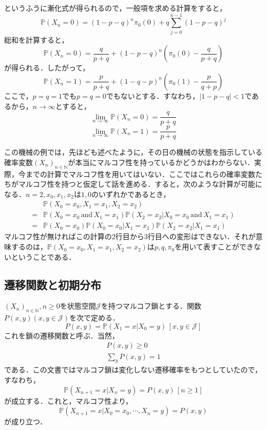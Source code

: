 \documentclass[12pt, a4paper]{jsarticle}
\theoremstyle{definition}
\newcommand{\NN}{{\mathbb{N}}} %
\begin{document}
というふうに漸化式が得られるので，一般項を求める計算をすると，
\begin{equation}
\mathbb{P}(X_n = 0) = (1-p-q)^n\pi_0(0) + q \sum_{j=0}^{n-1}(1-p-q)^j
\end{equation}
総和を計算すると，
\begin{equation}
	\mathbb{P}(X_n = 0) = \frac{q}{p+q} + (1- p- q)^{n} \left( \pi_0(0) - \frac{q}{p+ q} \right)
\end{equation}
が得られる．したがって，
\begin{equation}
	\mathbb{P}(X_n = 1) = \frac{p}{p+q} + (1- q- p)^{n} \left( \pi_0(1) - \frac{p}{q+ p} \right)
\end{equation}
ここで，$p=q=1$でも$p=q=0$でもないとする．すなわち，$|1-p-q| < 1$であるから，$n \to \infty$とすると，
\[\lim_{n \to \infty} \mathbb{P}(X_n = 0) = \frac{q}{p+q}\]
\[\lim_{n \to \infty} \mathbb{P}(X_n = 1) = \frac{p}{p+q}\]

この機械の例では，先ほども述べたように，その日の機械の状態を指示している確率変数$(X_n)_{n \in \NN}$が本当にマルコフ性を持っているかどうかはわからない．実際，今までの計算でマルコフ性を用いてはいない．ここではこれらの確率変数たちがマルコフ性を持つと仮定して話を進める．すると，次のような計算が可能になる．$n = 2,x_0,x_1,x_2$は$1,0$のいずれかであるとき，
\begin{align*}
	& \mathbb{P}(X_0 = x_0 , X_1 = x_1, X_2 = x_2) \\
	= &\mathbb{P}(X_0 = x_0\, \text{and}\, X_1 = x_1)\mathbb{P}(X_2 = x_2 | X_0 = x_0\, \text{and}\, X_1 = x_1 ) \\
	=&\mathbb{P}(X_0 = x_0)\mathbb{P}(X_0 = x_0| X_1 = x_1)\mathbb{P}(X_2 = x_2 | X_1 = x_1)
\end{align*}
マルコフ性が無ければこの計算の2行目から3行目への変形はできない．それが意味するのは，$\mathbb{P}(X_0 = x_0 , X_1 = x_1, X_2 = x_2)$は$p,q,\pi_0$を用いて表すことができないということである．

\subsection{遷移関数と初期分布}
$(X_{n})_{n \in \NN}, n \ge 0 $を状態空間$\mathcal{J}$を持つマルコフ鎖とする．関数$P(x,y) (x,y \in \mathcal{J})$を次で定める．
\begin{equation}
	P(x,y) = \mathbb{P}(X_1 = x| X_0 = y) \,[x,y \in \mathcal{J}]
\end{equation}
これを鎖の遷移関数と呼ぶ．当然，
\begin{align}
	P(x,y) \ge 0 \label{trans fcn1} \\
	\sum_y P(x,y) = 1 \label{trans fcn2}
\end{align}
である．この文書ではマルコフ鎖は変化しない遷移確率をもつとしていたので，すなわち，
\begin{equation}
	\mathbb{P}(X_{n+1} = x| X_n = y) = P(x,y) \,[n \ge 1]
\end{equation}
が成立する．これと，マルコフ性より，
\begin{equation}
	\mathbb{P}(X_{n+1} = x | X_0 = x_0 , \cdots , X_n = y) = P(x,y)	
\end{equation}
が成り立つ．
\end{document}
